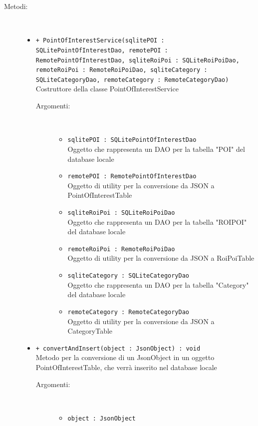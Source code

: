 \documentclass[../DefinizioneDiProdotto.tex]{subfiles}
\begin{document}
\begin{description}
\begin{itemize}
	\end{itemize}
	\item[Metodi:] \
	\begin{itemize}
		\item \texttt{+ PointOfInterestService(sqlitePOI : SQLitePointOfInterestDao, remotePOI : RemotePointOfInterestDao, sqliteRoiPoi : SQLiteRoiPoiDao, remoteRoiPoi : RemoteRoiPoiDao, sqliteCategory : SQLiteCategoryDao, remoteCategory : RemoteCategoryDao)}\\
		Costruttore della classe PointOfInterestService
		\begin{description}
			\item[Argomenti:] \
			\begin{itemize}
				\item \texttt{sqlitePOI : SQLitePointOfInterestDao}\\
				Oggetto che rappresenta un DAO per la tabella "POI" del database locale\item \texttt{remotePOI : RemotePointOfInterestDao}\\
				Oggetto di utility per la conversione da JSON a PointOfInterestTable\item \texttt{sqliteRoiPoi : SQLiteRoiPoiDao}\\
				Oggetto che rappresenta un DAO per la tabella "ROIPOI" del database locale\item \texttt{remoteRoiPoi : RemoteRoiPoiDao}\\
				Oggetto di utility per la conversione da JSON a RoiPoiTable\item \texttt{sqliteCategory : SQLiteCategoryDao}\\
				Oggetto che rappresenta un DAO per la tabella "Category" del database locale\item \texttt{remoteCategory : RemoteCategoryDao}\\
				Oggetto di utility per la conversione da JSON a CategoryTable\end{itemize}
		\end{description}
		\item \texttt{+ convertAndInsert(object : JsonObject) : void}\\
		Metodo per la conversione di un JsonObject in un oggetto PointOfInterestTable, che verrà inserito nel database locale
		\begin{description}
			\item[Argomenti:] \
			\begin{itemize}
				\item \texttt{object : JsonObject}\\

\end{itemize}
\end{description}
\end{itemize}
\end{description}
\end{document}
